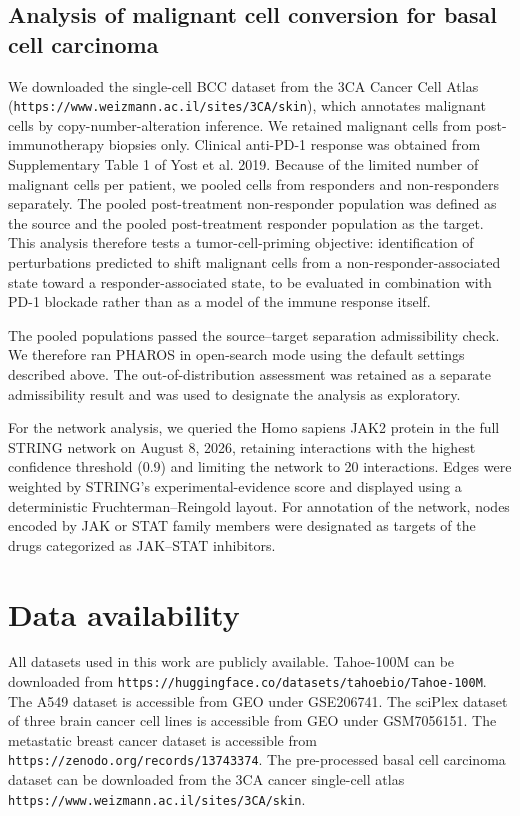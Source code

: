 \documentclass[11pt,a4paper]{article}
\begin{document}
\subsection{Analysis of malignant cell conversion for basal cell carcinoma}
We downloaded the single-cell BCC dataset from the 3CA Cancer Cell Atlas (\nolinkurl{https://www.weizmann.ac.il/sites/3CA/skin}), which annotates malignant cells by copy-number-alteration inference\cite{Tyler2025}. We retained malignant cells from post-immunotherapy biopsies only. Clinical anti-PD-1 response was obtained from Supplementary Table 1 of Yost et al. 2019\cite{Yost2019}. Because of the limited number of malignant cells per patient, we pooled cells from responders and non-responders separately. The pooled post-treatment non-responder population was defined as the source and the pooled post-treatment responder population as the target. This analysis therefore tests a tumor-cell-priming objective: identification of perturbations predicted to shift malignant cells from a non-responder-associated state toward a responder-associated state, to be evaluated in combination with PD-1 blockade rather than as a model of the immune response itself.

The pooled populations passed the source--target separation admissibility check. We therefore ran PHAROS in open-search mode using the default settings described above. The out-of-distribution assessment was retained as a separate admissibility result and was used to designate the analysis as exploratory.

For the network analysis, we queried the Homo sapiens JAK2 protein in the full STRING network on August 8, 2026, retaining interactions with the highest confidence threshold (0.9) and limiting the network to 20 interactions. Edges were weighted by STRING's experimental-evidence score and displayed using a deterministic Fruchterman--Reingold layout. For annotation of the network, nodes encoded by JAK or STAT family members were designated as targets of the drugs categorized as JAK--STAT inhibitors.

\section{Data availability}\label{sec12}
All datasets used in this work are publicly available. Tahoe-100M can be downloaded from \nolinkurl{https://huggingface.co/datasets/tahoebio/Tahoe-100M}. The A549 dataset is accessible from GEO under GSE206741. The sciPlex dataset of three brain cancer cell lines is accessible from GEO under GSM7056151. The metastatic breast cancer dataset is accessible from \nolinkurl{https://zenodo.org/records/13743374}. The pre-processed basal cell carcinoma dataset can be downloaded from the 3CA cancer single-cell atlas \nolinkurl{https://www.weizmann.ac.il/sites/3CA/skin}.
\end{document}
